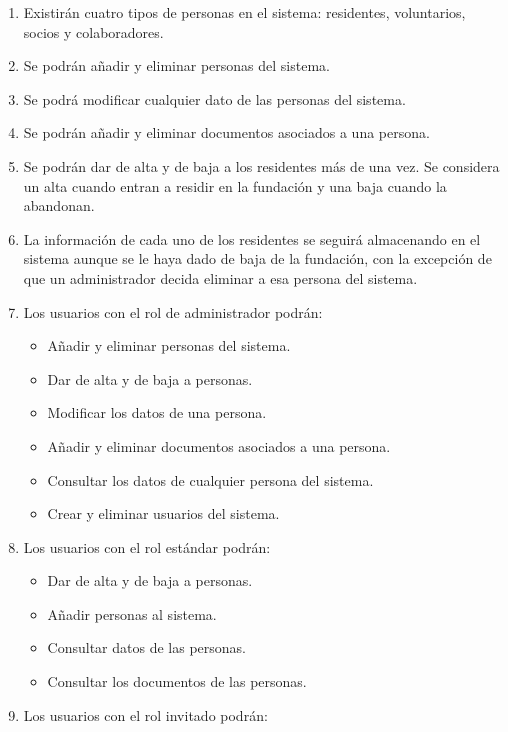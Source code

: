 \begin{enumerate}[start=9,label={RF-\arabic*.}]

    \item Existirán cuatro tipos de personas en el sistema: residentes, voluntarios, socios y colaboradores.
    \item Se podrán añadir y eliminar personas del sistema.
    \item Se podrá modificar cualquier dato de las personas del sistema.
    \item Se podrán añadir y eliminar documentos asociados a una persona.
    \item Se podrán dar de alta y de baja a los residentes más de una vez. Se considera un alta cuando entran a residir en la fundación y una baja cuando la abandonan.
    \item La información de cada uno de los residentes se seguirá almacenando en el sistema aunque se le haya dado de baja de la fundación, con la excepción de que un administrador decida eliminar a esa persona del sistema. 
    \item Los usuarios con el rol de administrador podrán:
    \begin{itemize}
        \item Añadir y eliminar personas del sistema.
        \item Dar de alta y de baja a personas.
        \item Modificar los datos de una persona.
        \item Añadir y eliminar documentos asociados a una persona.
        \item Consultar los datos de cualquier persona del sistema.
        \item Crear y eliminar usuarios del sistema.
    \end{itemize}
    \item Los usuarios con el rol estándar podrán:
        \begin{itemize}
            \item Dar de alta y de baja a personas.
            \item Añadir personas al sistema.
            \item Consultar datos de las personas.
            \item Consultar los documentos de las personas.
        \end{itemize}
    \item Los usuarios con el rol invitado podrán:
        \begin{itemize}

\end{itemize}
\end{enumerate}

